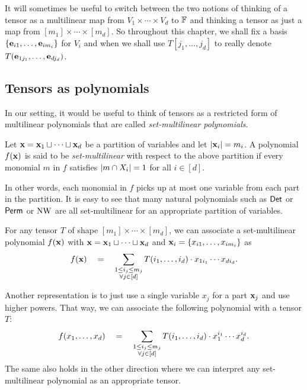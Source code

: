 It will sometimes be useful to switch between the two notions of thinking of a tensor as a multilinear map from $V_1 \times \cdots \times V_d$ to $\mathbb{F}$ and thinking a tensor as just a map from $[m_1] \times \cdots \times [m_d]$.
So throughout this chapter, we shall fix a basis $\left\{\mathbf{e}_{i1},\ldots, \mathbf{e}_{im_i}\right\}$ for $V_i$ and when we shall use $T[j_1,\ldots, j_d]$ to really denote $T(\mathbf{e}_{1j_1},\ldots, \mathbf{e}_{dj_d})$.

\subsection{Tensors as polynomials}

In our setting, it would be useful to think of tensors as a restricted form of multilinear polynomials that are called \emph{set-multilinear polynomials}.

\begin{definition}\label{defn:set-multilinear}
  Let $\mathbf{x} = \mathbf{x}_1 \sqcup \cdots \sqcup \mathbf{x}_d$ be a partition of variables and let $|\mathbf{x}_i| = m_i$.
A polynomial $f(\mathbf{x})$ is said to be \emph{set-multilinear} with respect to the above partition if every monomial $m$ in $f$ satisfies $\left|m \cap X_i\right| = 1$ for all $i \in [d]$.
\end{definition}
In other words, each monomial in $f$ picks up at most one variable from each part in the partition. It is easy to see that many natural polynomials such as $\operatorname{\mathsf{Det}}$ or $\operatorname{\mathsf{Perm}}$ or $\operatorname{\mathrm{NW}}$ are all set-multilinear for an appropriate partition of variables. 

\begin{observation}\label{obs:tensor-to-sml}
  For any tensor $T$ of shape $[m_1] \times \cdots \times [m_d]$, we can associate a set-multilinear polynomial $f(\mathbf{x})$ with $\mathbf{x} = \mathbf{x}_1 \sqcup \cdots \sqcup \mathbf{x}_d$ and $\mathbf{x}_i = \left\{x_{i1}, \ldots, x_{im_i}\right\}$ as
\begin{equation}\label{eqn:tensor-sml}
f(\mathbf{x}) \quad = \quad \sum_{\substack{1 \leq i_j \leq m_j\\ \forall j \in [d]}}  T(i_1,\ldots, i_d) \cdot x_{1i_1}\cdots x_{di_d}.
\end{equation}
\end{observation}

Another representation is to just use a single variable $x_j$ for a part $\mathbf{x}_j$ and use higher powers.
That way, we can associate the following polynomial with a tensor $T$:
\begin{equation}\label{eqn:tensor-to-prod-univariates}
f(x_1,\ldots, x_d) \quad = \quad \sum_{\substack{1 \leq i_j \leq m_j\\ \forall j \in [d]}}  T(i_1,\ldots, i_d) \cdot x_{1}^{i_1}\cdots x_{d}^{i_d}.
\end{equation}
The same also holds in the other direction where we can interpret any set-multilinear polynomial as an appropriate tensor. 


